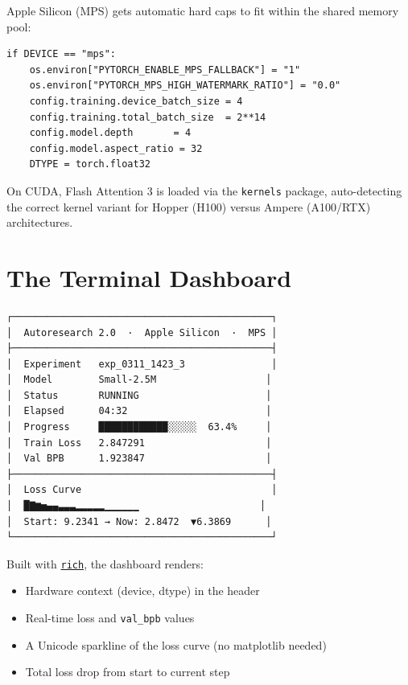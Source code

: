\documentclass[12pt, a4paper]{article}
\newcommand{\bpb}{\texttt{val\_bpb}}
\newcommand{\file}[1]{\texttt{#1}}
\begin{document}
Apple Silicon (MPS) gets automatic hard caps to fit within the shared memory pool:

\begin{tcolorbox}[codebox]
\begin{lstlisting}[style=pythonstyle]
if DEVICE == "mps":
    os.environ["PYTORCH_ENABLE_MPS_FALLBACK"] = "1"
    os.environ["PYTORCH_MPS_HIGH_WATERMARK_RATIO"] = "0.0"
    config.training.device_batch_size = 4
    config.training.total_batch_size  = 2**14
    config.model.depth       = 4
    config.model.aspect_ratio = 32
    DTYPE = torch.float32
\end{lstlisting}
\end{tcolorbox}

On CUDA, Flash Attention 3 is loaded via the \file{kernels} package, auto-detecting the
correct kernel variant for Hopper (H100) versus Ampere (A100/RTX) architectures.

\section{The Terminal Dashboard}

\begin{tcolorbox}[colback=darkbg, colframe=warmgray!40, arc=6pt, boxrule=0.8pt,
                  fontupper=\ttfamily\footnotesize\color{white}]
\begin{verbatim}
┌─────────────────────────────────────────────┐
│  Autoresearch 2.0  ·  Apple Silicon  ·  MPS │
├─────────────────────────────────────────────┤
│  Experiment   exp_0311_1423_3               │
│  Model        Small-2.5M                   │
│  Status       RUNNING                      │
│  Elapsed      04:32                        │
│  Progress     ████████████░░░░░  63.4%     │
│  Train Loss   2.847291                     │
│  Val BPB      1.923847                     │
├─────────────────────────────────────────────┤
│  Loss Curve                                 │
│  █▇▆▅▄▄▃▃▃▂▂▂▂▂▁▁▁▁▁▁                     │
│  Start: 9.2341 → Now: 2.8472  ▼6.3869      │
└─────────────────────────────────────────────┘
\end{verbatim}
\end{tcolorbox}

Built with \href{https://github.com/Textualize/rich}{\texttt{rich}}, the dashboard renders:
\begin{itemize}[leftmargin=*, itemsep=1pt]
  \item Hardware context (device, dtype) in the header
  \item Real-time loss and \bpb{} values
  \item A Unicode sparkline of the loss curve (no matplotlib needed)
  \item Total loss drop from start to current step
\end{itemize}
\end{document}
